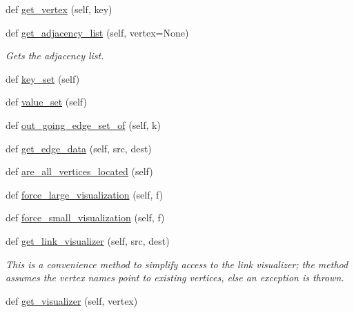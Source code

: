 \begin{DoxyCompactItemize}
def \mbox{\hyperlink{classbridges_1_1graph__adj__list_1_1_graph_adj_list_af484d881d91177e723faf8b8a5c427e2}{get\+\_\+vertex}} (self, key)
\item 
def \mbox{\hyperlink{classbridges_1_1graph__adj__list_1_1_graph_adj_list_a523adce952c66505abc5ad14a83ae4c4}{get\+\_\+adjacency\+\_\+list}} (self, vertex=None)
\begin{DoxyCompactList}\small\item\em Gets the adjacency list. \end{DoxyCompactList}\item 
def \mbox{\hyperlink{classbridges_1_1graph__adj__list_1_1_graph_adj_list_a96e264e71acad7474e233a1ec1d1035a}{key\+\_\+set}} (self)
\item 
def \mbox{\hyperlink{classbridges_1_1graph__adj__list_1_1_graph_adj_list_ae12db7b48cf37ba8d2852fa05ebaa2c0}{value\+\_\+set}} (self)
\item 
def \mbox{\hyperlink{classbridges_1_1graph__adj__list_1_1_graph_adj_list_a4ae90f3f2db5f44219fe2a6f9035c9d6}{out\+\_\+going\+\_\+edge\+\_\+set\+\_\+of}} (self, k)
\item 
def \mbox{\hyperlink{classbridges_1_1graph__adj__list_1_1_graph_adj_list_abf7a65867ab342ef0eda4a34b3fe011e}{get\+\_\+edge\+\_\+data}} (self, src, dest)
\item 
def \mbox{\hyperlink{classbridges_1_1graph__adj__list_1_1_graph_adj_list_a9041f2a5c754141afbc41f02c6a2771c}{are\+\_\+all\+\_\+vertices\+\_\+located}} (self)
\item 
def \mbox{\hyperlink{classbridges_1_1graph__adj__list_1_1_graph_adj_list_aa0eaa5a21f8d8905d02454a83151c20e}{force\+\_\+large\+\_\+visualization}} (self, f)
\item 
def \mbox{\hyperlink{classbridges_1_1graph__adj__list_1_1_graph_adj_list_a036b6368bf916474da748e96dd93ec5a}{force\+\_\+small\+\_\+visualization}} (self, f)
\item 
def \mbox{\hyperlink{classbridges_1_1graph__adj__list_1_1_graph_adj_list_abaa3015ae78e0f5ebc6fd2d2d2772927}{get\+\_\+link\+\_\+visualizer}} (self, src, dest)
\begin{DoxyCompactList}\small\item\em This is a convenience method to simplify access to the link visualizer; the method assumes the vertex names point to existing vertices, else an exception is thrown. \end{DoxyCompactList}\item 
def \mbox{\hyperlink{classbridges_1_1graph__adj__list_1_1_graph_adj_list_ad63fce416ec0fdfd99d05e6236807fd8}{get\+\_\+visualizer}} (self, vertex)

\end{DoxyCompactItemize}
